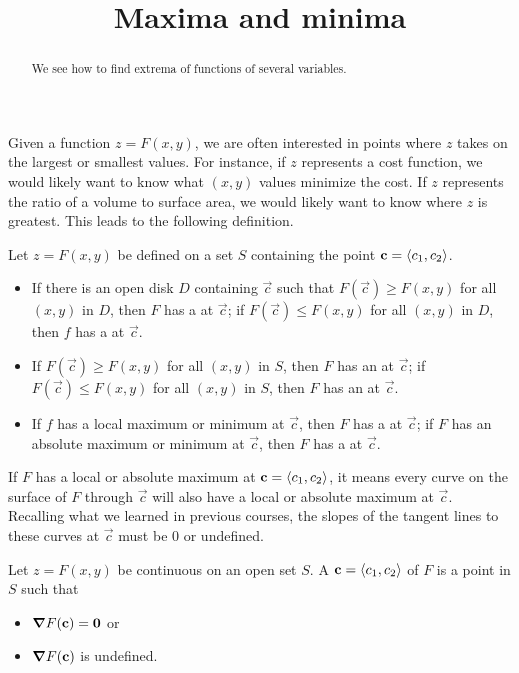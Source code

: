 \documentclass{ximera}
\title[Dig-In:]{Maxima and minima}
\begin{document}
\begin{abstract}
  We see how to find extrema of functions of several variables.
\end{abstract}
\maketitle

Given a function $z=F(x,y)$, we are often interested in points where
$z$ takes on the largest or smallest values. For instance, if $z$
represents a cost function, we would likely want to know what $(x,y)$
values minimize the cost. If $z$ represents the ratio of a volume to
surface area, we would likely want to know where $z$ is greatest. This
leads to the following definition.

\begin{definition}
Let $z=F(x,y)$ be defined on a set $S$ containing the point $\mathbf{c}=\left\langle c_1,c_2\right\rangle$.
\begin{itemize}
\item If there is an open disk $D$ containing $\vec{c}$ such that
  $F(\vec{c}) \geq F(x,y)$ for all $(x,y)$ in $D$, then $F$ has a
   at $\vec{c}$; if $F(\vec{c}) \leq F(x,y)$ for all
  $(x,y)$ in $D$, then $f$ has a  at $\vec{c}$.
\item If $F(\vec{c})\geq F(x,y)$ for all $(x,y)$ in $S$, then $F$ has
  an  at $\vec{c}$; if $F(\vec{c})\leq F(x,y)$ for
  all $(x,y)$ in $S$, then $F$ has an  at
  $\vec{c}$.
\item If $f$ has a local maximum or minimum at $\vec{c}$, then $F$ has a
   at $\vec{c}$; if $F$ has an absolute maximum or
  minimum at $\vec{c}$, then $F$ has a  at $\vec{c}$.
\end{itemize}
\end{definition}

If $F$ has a local or absolute maximum at $\mathbf{c}=\left\langle c_1,c_2\right\rangle$, it means
every curve on the surface of $F$ through $\vec{c}$ will also have a
local or absolute maximum at $\vec{c}$. Recalling what we learned in
previous courses, the slopes of the tangent lines to these curves at
$\vec{c}$ must be $0$ or undefined.


\begin{definition}
  Let $z = F(x,y)$ be continuous on an open set $S$. A
   $\mathbf{c}=\left\langle c_1,c_2\right\rangle$ of $F$ is a point in $S$ such
  that
  \begin{itemize}
  \item $\boldsymbol\nabla F(\mathbf{c}) = \mathbf{0}$ or
  \item $\boldsymbol\nabla F(\mathbf{c})$ is undefined.
  \end{itemize}
\end{definition}
\end{document}

